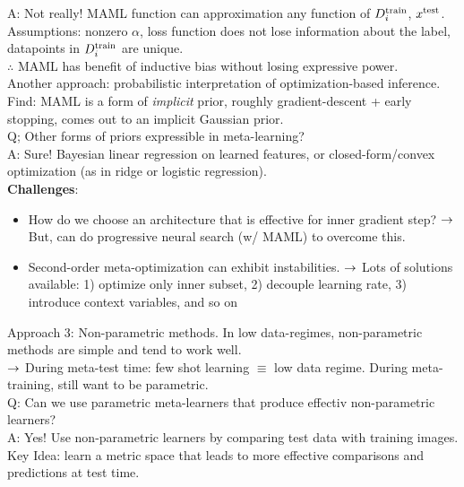 A: Not really! MAML function can approximation any function of $D_i^{\text{train}}$, $x^{\text{test}}$. Assumptions: nonzero $\alpha$, loss function does not lose information about the label, datapoints in $D_i^{\text{train}}$ are unique. \\

$\therefore$ MAML has benefit of inductive bias without losing expressive power. \\

Another approach: probabilistic interpretation of optimization-based inference. Find: MAML is a form of {\it implicit} prior, roughly gradient-descent + early stopping, comes out to an implicit Gaussian prior. \\

Q; Other forms of priors expressible in meta-learning?  \\

A: Sure! Bayesian linear regression on learned features, or closed-form/convex optimization (as in ridge or logistic regression). \\


{\bf Challenges}:
\begin{itemize}
\item How do we choose an architecture that is effective for inner gradient step?
$\rightarrow$ But, can do progressive neural search (w/ MAML) to overcome this.

\item Second-order meta-optimization can exhibit instabilities.
$\rightarrow$ Lots of solutions available: 1) optimize only inner subset, 2) decouple learning rate, 3) introduce context variables, and so on
\end{itemize}


Approach 3: Non-parametric methods. In low data-regimes, non-parametric methods are simple and tend to work well. \\

$\rightarrow$ During meta-test time: few shot learning $\equiv$ low data regime. During meta-training, still want to be parametric. \\

Q: Can we use parametric meta-learners that produce effectiv non-parametric learners? \\

A: Yes! Use non-parametric learners by comparing test data with training images. \\

Key Idea: learn a metric space that leads to more effective comparisons and predictions at test time. \\

